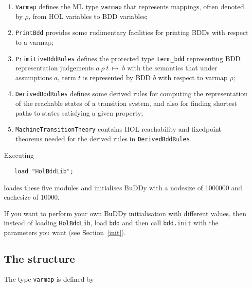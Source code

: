 \documentclass[12pt,fleqn]{article}
\renewcommand{\t}[1]{\mbox{\tt #1}}
\newcommand{\termbdd}[4]{\mbox{$#1~#2~#3~\mapsto~#4$}}
\newcommand\termbddty{\texttt{term\_bdd}{}}
\newcommand{\Buddy}{BuDDy{}}
\begin{document}
\begin{enumerate}
\item \t{Varmap} defines the ML type \t{varmap} that represents mappings,
often denoted by $\rho$,
from HOL variables to BDD variables;

\item \t{PrintBdd} provides some rudimentary facilities for printing
BDDs with respect to a varmap;

\item \t{PrimitiveBddRules} defines the protected type \termbddty
representing BDD representation judgements \termbdd{a}{\rho}{t}{b}
with the semantics that under assumptions $a$, term $t$ is represented by BDD $b$ with respect to
varmap $\rho$;

\item \t{DerivedBddRules} defines some derived rules for computing
the representation of the reachable states of a transition system,
and also for finding shortest paths to states  satisfying a given property;

\item \t{MachineTransitionTheory} contains HOL reachability and fixedpoint theorems needed
for the derived rules in  \t{DerivedBddRules}.


\end{enumerate}


Executing

\vspace*{-2mm}

\begin{verbatim}
   load "HolBddLib";
\end{verbatim}

\vspace*{-2mm}

loades these five modules and
initialises \Buddy{} with a nodesize of 1000000
and cachesize of 10000.  

If you want to perform your own \Buddy{} initialisation with different
values, then instead of loading \t{HolBddLib}, load \t{bdd} and then
call \t{bdd.init} with the parameters you want (see Section~\ref{init}).  

\subsection{The structure }\label{Varmap}

The type \t{varmap} is defined by

\vspace*{-2mm}
\end{document}
